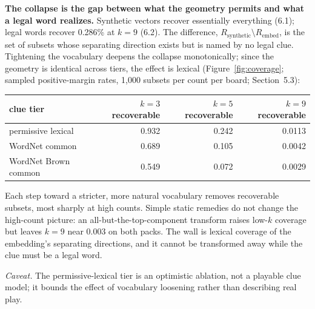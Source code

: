 \documentclass[11pt]{article}
\begin{document}
\textbf{The collapse is the gap between what the geometry permits and what a legal
word realizes.} Synthetic vectors recover essentially everything (6.1); legal
words recover 0.286\% at $k = 9$ (6.2). The difference,
$R_{\mathrm{synthetic}} \setminus R_{\mathrm{embed}}$, is the set of subsets whose
separating direction exists but is named by no legal clue. Tightening the
vocabulary deepens the collapse monotonically; since the geometry is identical
across tiers, the effect is lexical (Figure~\ref{fig:coverage}; sampled positive-margin rates,
1,000 subsets per count per board; Section~5.3):

\begin{center}
\begin{tabular}{lrrr}
\toprule
clue tier & $k{=}3$ recoverable & $k{=}5$ recoverable & $k{=}9$ recoverable \\
\midrule
permissive lexical  & 0.932 & 0.242 & 0.0113 \\
WordNet common      & 0.689 & 0.105 & 0.0042 \\
WordNet Brown common & 0.549 & 0.072 & 0.0029 \\
\bottomrule
\end{tabular}
\end{center}

Each step toward a stricter, more natural vocabulary removes recoverable subsets,
most sharply at high counts. Simple static remedies do not change the high-count
picture: an all-but-the-top-component transform raises low-$k$ coverage but leaves
$k = 9$ near 0.003 on both packs. The wall is lexical coverage of the embedding's
separating directions, and it cannot be transformed away while the clue must be a
legal word.

\emph{Caveat.} The permissive-lexical tier is an optimistic ablation, not a
playable clue model; it bounds the effect of vocabulary loosening rather than
describing real play.
\end{document}
